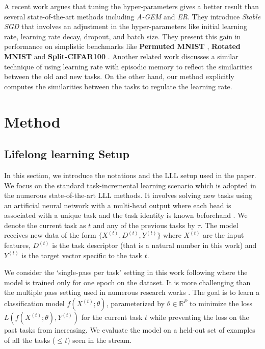 \documentclass{article} \usepackage{collas2022_conference,times}
\begin{document}
    A recent work \citep{mirzadeh2020understanding} argues that tuning the hyper-parameters gives a better result than several state-of-the-art methods including \textit{A-GEM} and \textit{ER}. They introduce \textit{Stable SGD} that involves an adjustment in the hyper-parameters like initial learning rate, learning rate decay, dropout, and batch size. They present this gain in performance on simplistic benchmarks like \textbf{Permuted MNIST} \citep{goodfellow2013empirical}, \textbf{Rotated MNIST} and \textbf{Split-CIFAR100} \citep{mirzadeh2020understanding}. { Another related work \citep{gupta2020maml} discusses a similar technique of using learning rate with episodic memory to reflect the similarities between the old and new tasks. On the other hand, our method explicitly computes the similarities between the tasks to regulate the learning rate.}




\section{Method}\label{tag_sec}
\subsection{Lifelong learning Setup}

In this section, we introduce the notations and the LLL setup used in the paper. We focus on the standard task-incremental learning scenario which is adopted in the numerous state-of-the-art LLL methods. It involves solving new tasks using an artificial neural network with a multi-head output where each head is associated with a unique task and the task identity is known beforehand \citep{lopez2017gradient,van2019three,delange2021continual}. We denote the current task as $t$ and any of the previous tasks by $\tau$. The model receives new data of the form $\{X^{(t)}, D^{(t)}, Y^{(t)}\}$ where $X^{(t)}$ are the input features, $D^{(t)}$ is the task descriptor (that is a natural number in this work) and $Y^{(t)}$ is the target vector specific to the task $t$.
    
We consider the `single-pass per task' setting in this work following \citep{lopez2017gradient,riemer2018learning,chaudhry2019tiny} where the model is trained only for one epoch on the dataset. It is more challenging than the multiple pass setting used in numerous research works \citep{kirkpatrick2017overcoming,rebuffi2017icarl}. The goal is to learn a classification model $f(X^{(t)}; \theta)$, parameterized by $\theta \in \mathbb{R}^P$ to minimize the loss $L(f(X^{(t)}; \theta), Y^{(t)})$ for the current task $t$ while preventing the loss on the past tasks from increasing. We evaluate the model on a held-out set of examples of all the tasks ($\leq t$) seen in the stream. 
\end{document}
